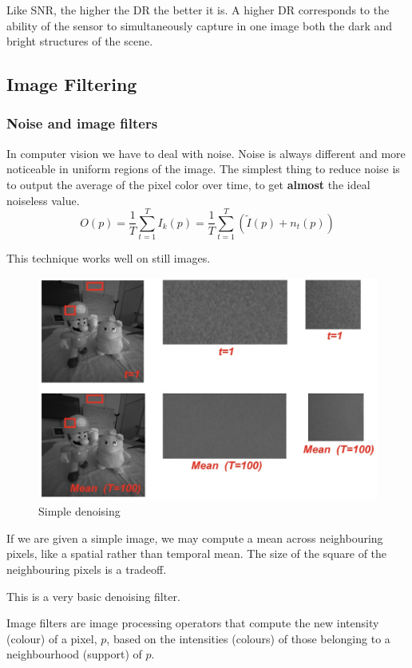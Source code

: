\documentclass{article}
\begin{document}
Like SNR, the higher the DR the better it is.
A higher DR corresponds to the ability of the sensor to simultaneously capture in one image both the dark and bright structures of the scene.

\subsection{Image Filtering}

\subsubsection{Noise and image filters}

In computer vision we have to deal with noise.
Noise is always different and more noticeable in uniform regions of the image.
The simplest thing to reduce noise is to output the average of the pixel color over time, to get \textbf{almost} the ideal noiseless value.
$$O(p) = \frac{1}{T} \sum_{t=1}^{T} I_k(p) = \frac{1}{T} \sum_{t=1}^{T}(\tilde{I}(p) + n_t(p))$$

This technique works well on still images.

\begin{figure}[htbp]
  \centering
  \includegraphics[width=0.7\linewidth]{./img/denoising_simple.jpg}
  \caption{Simple denoising}
  \label{fig:denoising_simple}
\end{figure}

If we are given a simple image, we may compute a mean across neighbouring pixels, like a spatial rather than temporal mean.
The size of the square of the neighbouring pixels is a tradeoff.

This is a very basic denoising filter.

Image filters are image processing operators that compute the new intensity (colour) of a pixel, $p$, based on the intensities (colours) of those belonging to a neighbourhood (support) of $p$.
\end{document}
